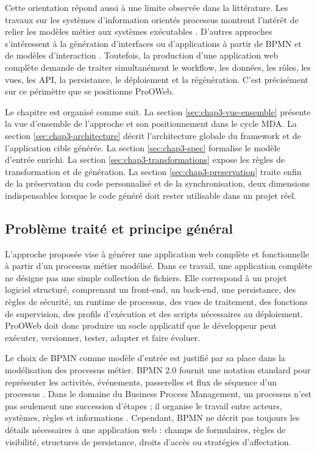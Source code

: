 Cette orientation répond aussi à une limite observée dans la littérature. Les travaux sur les systèmes d'information orientés processus montrent l'intérêt de relier les modèles métier aux systèmes exécutables \cite{drave2022}. D'autres approches s'intéressent à la génération d'interfaces ou d'applications à partir de BPMN et de modèles d'interaction \cite{sajji2022,sajji2023,diaz2018}. Toutefois, la production d'une application web complète demande de traiter simultanément le workflow, les données, les rôles, les vues, les API, la persistance, le déploiement et la régénération. C'est précisément sur ce périmètre que se positionne ProOWeb.

Le chapitre est organisé comme suit. La section \ref{sec:chap3-vue-ensemble} présente la vue d'ensemble de l'approche et son positionnement dans le cycle MDA. La section \ref{sec:chap3-architecture} décrit l'architecture globale du framework et de l'application cible générée. La section \ref{sec:chap3-spec} formalise le modèle d'entrée enrichi. La section \ref{sec:chap3-transformations} expose les règles de transformation et de génération. La section \ref{sec:chap3-preservation} traite enfin de la préservation du code personnalisé et de la synchronisation, deux dimensions indispensables lorsque le code généré doit rester utilisable dans un projet réel.

\label{sec:chap3-vue-ensemble}

\subsection{Problème traité et principe général}

L'approche proposée vise à générer une application web complète et fonctionnelle à partir d'un processus métier modélisé. Dans ce travail, une application complète ne désigne pas une simple collection de fichiers. Elle correspond à un projet logiciel structuré, comprenant un front-end, un back-end, une persistance, des règles de sécurité, un runtime de processus, des vues de traitement, des fonctions de supervision, des profils d'exécution et des scripts nécessaires au déploiement. ProOWeb doit donc produire un socle applicatif que le développeur peut exécuter, versionner, tester, adapter et faire évoluer.

Le choix de BPMN comme modèle d'entrée est justifié par sa place dans la modélisation des processus métier. BPMN 2.0 fournit une notation standard pour représenter les activités, événements, passerelles et flux de séquence d'un processus \cite{omg2013bpmn}. Dans le domaine du Business Process Management, un processus n'est pas seulement une succession d'étapes ; il organise le travail entre acteurs, systèmes, règles et informations \cite{dumas2018fundamentals,weske2012bpm}. Cependant, BPMN ne décrit pas toujours les détails nécessaires à une application web : champs de formulaires, règles de visibilité, structures de persistance, droits d'accès ou stratégies d'affectation.

